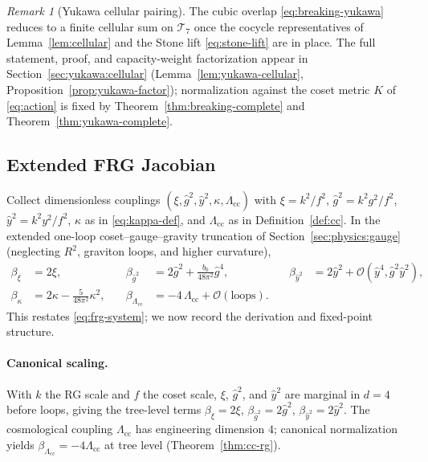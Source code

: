 \documentclass[aps,prd,onecolumn,amsmath,amssymb,nofootinbib,11pt]{revtex4-2}
\numberwithin{equation}{section}
\theoremstyle{plain}
\theoremstyle{definition}
\theoremstyle{remark}
\newtheorem{remark}[theorem]{Remark}
\begin{document}
\begin{remark}[Yukawa cellular pairing]
The cubic overlap \eqref{eq:breaking-yukawa} reduces to a finite cellular sum
on $\mathcal{T}_7$ once the cocycle representatives of Lemma~\ref{lem:cellular}
and the Stone lift \eqref{eq:stone-lift} are in place. The full statement,
proof, and capacity-weight factorization appear in
Section~\ref{sec:yukawa:cellular} (Lemma~\ref{lem:yukawa-cellular},
Proposition~\ref{prop:yukawa-factor}); normalization against the coset metric
$K$ of \eqref{eq:action} is fixed by Theorem~\ref{thm:breaking-complete}
and Theorem~\ref{thm:yukawa-complete}.
\end{remark}

\subsection{Extended FRG Jacobian}
\label{sec:appendix:frg}

Collect dimensionless couplings
$(\xi,\hat g^2,\hat y^2,\kappa,\Lambda_{\mathrm{cc}})$ with
$\xi=k^2/f^2$, $\hat g^2=k^2 g^2/f^2$, $\hat y^2=k^2 y^2/f^2$,
$\kappa$ as in \eqref{eq:kappa-def}, and $\Lambda_{\mathrm{cc}}$ as in
Definition~\ref{def:cc}. In the extended one-loop coset--gauge--gravity
truncation of Section~\ref{sec:physics:gauge} (neglecting $R^2$, graviton
loops, and higher curvature),
\begin{equation}\label{eq:frg-system-app}
\begin{aligned}
  \beta_{\xi}&=2\xi,
  &\quad
  \beta_{\hat g^2}&=2\hat g^2+\frac{b_0}{48\pi^2}\hat g^4,
  &\quad
  \beta_{\hat y^2}&=2\hat y^2+\mathcal{O}(\hat y^4,\hat g^2\hat y^2),
  \\[4pt]
  \beta_{\kappa}&=2\kappa-\frac{5}{48\pi^2}\kappa^2,
  &\quad
  \beta_{\Lambda_{\mathrm{cc}}}&=-4\,\Lambda_{\mathrm{cc}}+\mathcal{O}(\text{loops}).
\end{aligned}
\end{equation}
This restates \eqref{eq:frg-system}; we now record the derivation and
fixed-point structure.

\paragraph{Canonical scaling.}
With $k$ the RG scale and $f$ the coset scale, $\xi$, $\hat g^2$, and
$\hat y^2$ are marginal in $d=4$ before loops, giving the tree-level terms
$\beta_{\xi}=2\xi$, $\beta_{\hat g^2}=2\hat g^2$, $\beta_{\hat y^2}=2\hat y^2$.
The cosmological coupling $\Lambda_{\mathrm{cc}}$ has engineering dimension
$4$; canonical normalization yields $\beta_{\Lambda_{\mathrm{cc}}}=-4\Lambda_{\mathrm{cc}}$
at tree level (Theorem~\ref{thm:cc-rg}).
\end{document}
